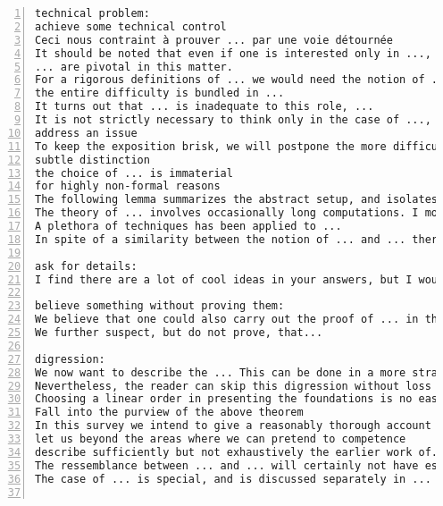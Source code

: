 \documentclass[11pt]{amsart}
\begin{document}
\begin{lstlisting}[numbers=left,numberstyle=\tiny,numbersep=10pt]
technical problem:
achieve some technical control
Ceci nous contraint à prouver ... par une voie détournée
It should be noted that even if one is interested only in ..., the proofs often involve more general ...
... are pivotal in this matter.
For a rigorous definitions of ... we would need the notion of ..., which would take us too far away from the subject of ...
the entire difficulty is bundled in ...
It turns out that ... is inadequate to this role, ...
It is not strictly necessary to think only in the case of ..., but it certainly allows one to ignore some technical difficulties.
address an issue
To keep the exposition brisk, we will postpone the more difficult proofs until ...
subtle distinction
the choice of ... is immaterial
for highly non-formal reasons
The following lemma summarizes the abstract setup, and isolates the key property that we need to prove in our situation.
The theory of ... involves occasionally long computations. I moved several of them to the end of .... The reader may want to do some of them as exercises without looking first at these appendices.
A plethora of techniques has been applied to ...
In spite of a similarity between the notion of ... and ... there are essential differences.

ask for details:
I find there are a lot of cool ideas in your answers, but I would be grateful if you could be a bit more precise.

believe something without proving them:
We believe that one could also carry out the proof of ... in the language of ..., but we  have not investigated the details.
We further suspect, but do not prove, that...

digression:
We now want to describe the ... This can be done in a more straightforward way, but we prefer to include a short digression in ... theory as this allows us to mention a general fact which is in the background of a later construction anyhow.
Nevertheless, the reader can skip this digression without loss of continuity and continue with ... instead.
Choosing a linear order in presenting the foundations is no easy task.
Fall into the purview of the above theorem
In this survey we intend to give a reasonably thorough account of the recent work, though mostly without detailed proofs
let us beyond the areas where we can pretend to competence
describe sufficiently but not exhaustively the earlier work of...
The ressemblance between ... and ... will certainly not have escaped the reader's sagacity.
The case of ... is special, and is discussed separately in ...


\end{lstlisting}
\end{document}
